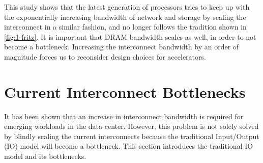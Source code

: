 This study shows that the latest generation of processors tries to keep up with the exponentially increasing bandwidth of network and storage by scaling the interconnect in a similar fashion, and no longer follows the tradition shown in \autoref{fig:1-fritz}. It is important that DRAM bandwidth scales as well, in order to not become a bottleneck. Increasing the interconnect bandwidth by an order of magnitude forces us to reconsider design choices for accelerators.





\section{Current Interconnect Bottlenecks}
\label{sec:current}
It has been shown that an increase in interconnect bandwidth is required for emerging workloads in the data center. However, this problem is not solely solved by blindly scaling the current interconnects because the traditional Input/Output (IO) model will become a bottleneck. This section introduces the traditional IO model and its bottlenecks.




